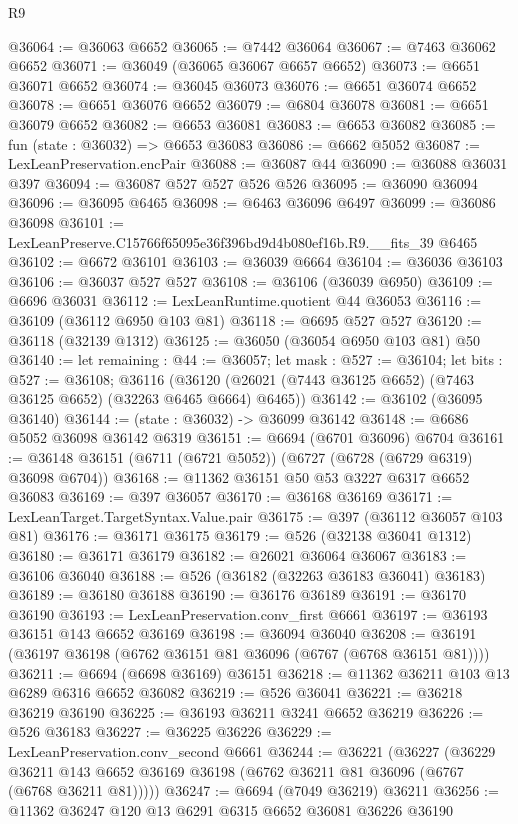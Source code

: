 \begin{lexlean}{R9}
\begin{coremodule}
@36064 := @36063 @6652
@36065 := @7442 @36064
@36067 := @7463 @36062 @6652
@36071 := @36049 (@36065 @36067 @6657 @6652)
@36073 := @6651 @36071 @6652
@36074 := @36045 @36073
@36076 := @6651 @36074 @6652
@36078 := @6651 @36076 @6652
@36079 := @6804 @36078
@36081 := @6651 @36079 @6652
@36082 := @6653 @36081
@36083 := @6653 @36082
@36085 := fun (state : @36032) => @6653 @36083
@36086 := @6662 @5052
@36087 := LexLeanPreservation.encPair
@36088 := @36087 @44
@36090 := @36088 @36031 @397
@36094 := @36087 @527 @527 @526 @526
@36095 := @36090 @36094
@36096 := @36095 @6465
@36098 := @6463 @36096 @6497
@36099 := @36086 @36098
@36101 := LexLeanPreserve.C15766f65095e36f396bd9d4b080ef16b.R9.__fits_39 @6465
@36102 := @6672 @36101
@36103 := @36039 @6664
@36104 := @36036 @36103
@36106 := @36037 @527 @527
@36108 := @36106 (@36039 @6950)
@36109 := @6696 @36031
@36112 := LexLeanRuntime.quotient @44 @36053
@36116 := @36109 (@36112 @6950 @103 @81)
@36118 := @6695 @527 @527
@36120 := @36118 (@32139 @1312)
@36125 := @36050 (@36054 @6950 @103 @81) @50
@36140 := let remaining : @44 := @36057;
  let mask : @527 := @36104;
  let bits : @527 := @36108;
  @36116 (@36120 (@26021 (@7443 @36125 @6652) (@7463 @36125 @6652) (@32263 @6465 @6664) @6465))
@36142 := @36102 (@36095 @36140)
@36144 := (state : @36032) -> @36099 @36142
@36148 := @6686 @5052 @36098 @36142 @6319
@36151 := @6694 (@6701 @36096) @6704
@36161 := @36148 @36151 (@6711 (@6721 @5052)) (@6727 (@6728 (@6729 @6319) @36098 @6704))
@36168 := @11362 @36151 @50 @53 @3227 @6317 @6652 @36083
@36169 := @397 @36057
@36170 := @36168 @36169
@36171 := LexLeanTarget.TargetSyntax.Value.pair
@36175 := @397 (@36112 @36057 @103 @81)
@36176 := @36171 @36175
@36179 := @526 (@32138 @36041 @1312)
@36180 := @36171 @36179
@36182 := @26021 @36064 @36067
@36183 := @36106 @36040
@36188 := @526 (@36182 (@32263 @36183 @36041) @36183)
@36189 := @36180 @36188
@36190 := @36176 @36189
@36191 := @36170 @36190
@36193 := LexLeanPreservation.conv_first @6661
@36197 := @36193 @36151 @143 @6652 @36169
@36198 := @36094 @36040
@36208 := @36191 (@36197 @36198 (@6762 @36151 @81 @36096 (@6767 (@6768 @36151 @81))))
@36211 := @6694 (@6698 @36169) @36151
@36218 := @11362 @36211 @103 @13 @6289 @6316 @6652 @36082
@36219 := @526 @36041
@36221 := @36218 @36219 @36190
@36225 := @36193 @36211 @3241 @6652 @36219
@36226 := @526 @36183
@36227 := @36225 @36226
@36229 := LexLeanPreservation.conv_second @6661
@36244 := @36221
    (@36227
      (@36229 @36211 @143 @6652 @36169 @36198 (@6762 @36211 @81 @36096 (@6767 (@6768 @36211 @81)))))
@36247 := @6694 (@7049 @36219) @36211
@36256 := @11362 @36247 @120 @13 @6291 @6315 @6652 @36081 @36226 @36190

\end{coremodule}
\end{lexlean}
